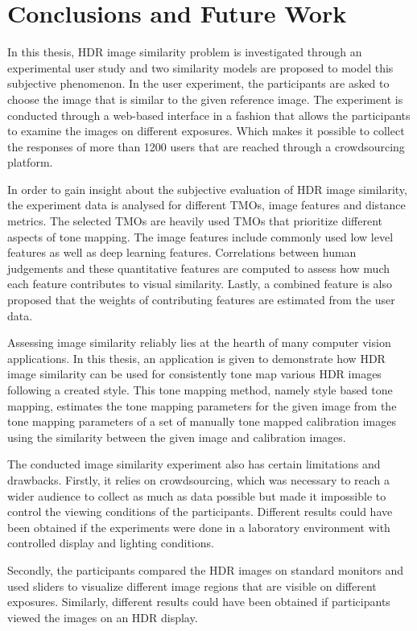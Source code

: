 \chapter{Conclusions and Future Work}
\label{chp:b7}

In this thesis, HDR image similarity problem is investigated through an experimental user study and two similarity models are proposed to model this subjective phenomenon. In the user experiment, the participants are asked to choose the image that is similar to the given reference image. The experiment is conducted through a web-based interface in a fashion that allows the participants to examine the images on different exposures. Which makes it possible to collect the responses of more than 1200 users that are reached through a crowdsourcing platform.

In order to gain insight about the subjective evaluation of HDR image similarity, the experiment data is analysed for different TMOs, image features and distance metrics. The selected TMOs are heavily used TMOs that prioritize different aspects of tone mapping. The image features include commonly used low level features as well as deep learning features. Correlations between human judgements and these quantitative features are computed to assess how much each feature contributes to visual similarity. Lastly, a combined feature is also proposed that the weights of contributing features are estimated from the user data.

Assessing image similarity reliably lies at the hearth of many computer vision applications. In this thesis, an application is given to demonstrate how HDR image similarity can be used for consistently tone map various HDR images following a created style. This tone mapping method, namely style based tone mapping, estimates the tone mapping parameters for the given image from the tone mapping parameters of a set of manually tone mapped calibration images using the similarity between the given image and calibration images. 

The conducted image similarity experiment also has certain limitations and drawbacks. Firstly, it relies on crowdsourcing, which was necessary to reach a wider audience to collect as much as data possible but made it impossible to control the viewing conditions of the participants. Different results could have been obtained if the experiments were done in a laboratory environment with controlled display and lighting conditions.

Secondly, the participants compared the HDR images on standard monitors and used sliders to visualize different image regions that are visible on different exposures. Similarly, different results could have been obtained if participants viewed the images on an HDR display. 


